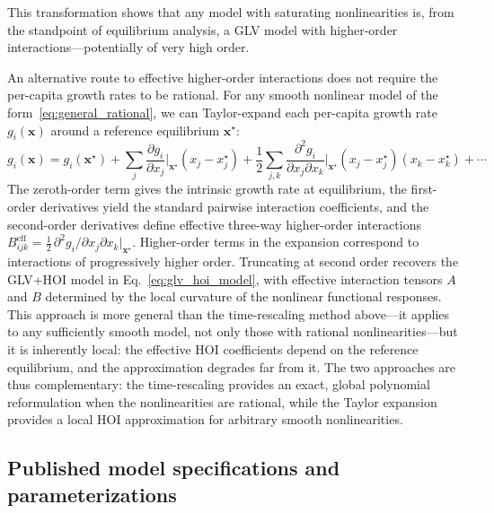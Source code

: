 \documentclass[pdflatex,sn-mathphys-num]{sn-jnl}%
\begin{document}
This transformation shows that any model with saturating nonlinearities is, from the standpoint of equilibrium analysis, a GLV model with higher-order interactions---potentially of very high order.

An alternative route to effective higher-order interactions does not require the per-capita growth rates to be rational. For any smooth nonlinear model of the form~\eqref{eq:general_rational}, we can Taylor-expand each per-capita growth rate $g_i(\mathbf{x})$ around a reference equilibrium $\mathbf{x}^\star$:
\begin{equation}
 g_i(\mathbf{x}) = g_i(\mathbf{x}^\star) + \sum_j \frac{\partial g_i}{\partial x_j}\bigg|_{\mathbf{x}^\star} (x_j - x_j^\star) + \frac{1}{2}\sum_{j,k} \frac{\partial^2 g_i}{\partial x_j \partial x_k}\bigg|_{\mathbf{x}^\star} (x_j - x_j^\star)(x_k - x_k^\star) + \cdots
 \label{eq:taylor_hoi}
\end{equation}
The zeroth-order term gives the intrinsic growth rate at equilibrium, the first-order derivatives yield the standard pairwise interaction coefficients, and the second-order derivatives define effective three-way higher-order interactions $B_{ijk}^{\mathrm{eff}} = \frac{1}{2}\,\partial^2 g_i / \partial x_j \partial x_k |_{\mathbf{x}^\star}$. Higher-order terms in the expansion correspond to interactions of progressively higher order. Truncating at second order recovers the GLV+HOI model in Eq.~\eqref{eq:glv_hoi_model}, with effective interaction tensors $A$ and $B$ determined by the local curvature of the nonlinear functional responses. This approach is more general than the time-rescaling method above---it applies to any sufficiently smooth model, not only those with rational nonlinearities---but it is inherently local: the effective HOI coefficients depend on the reference equilibrium, and the approximation degrades far from it. The two approaches are thus complementary: the time-rescaling provides an exact, global polynomial reformulation when the nonlinearities are rational, while the Taylor expansion provides a local HOI approximation for arbitrary smooth nonlinearities.

\subsection{Published model specifications and parameterizations}
\label{sec:si_models}
\end{document}
